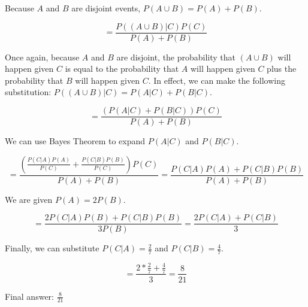 \documentclass{article}
\begin{document}
  Because $A$ and $B$ are disjoint events, $P(A \cup B) = P(A) + P(B)$. 
  
 \begin{equation}
     = \frac{P((A \cup B) | C)P(C)}{P(A) + P(B)}
 \end{equation}
 
 Once again, because $A$ and $B$ are disjoint, the probability that $(A \cup B)$ will happen given $C$ is equal to the probability that $A$ will happen given $C$ plus the probability that $B$ will happen given $C$. In effect, we can make the following substitution: $P((A \cup B) | C) = P(A|C) + P(B|C)$.
 
 \begin{equation}
     = \frac{(P(A|C)+P(B|C))P(C)}{P(A) + P(B)}
 \end{equation}
 
 We can use Bayes Theorem to expand $P(A|C)$ and $P(B|C)$. 
 
 \begin{equation}
     = \frac{(\frac{P(C|A)P(A)}{P(C)}+\frac{P(C|B)P(B)}{P(C)})P(C)}{P(A) + P(B)} = \frac{P(C|A)P(A)+P(C|B)P(B)}{P(A) + P(B)}
 \end{equation}
 
 We are given $P(A) = 2P(B)$.
 
 \begin{equation}
     = \frac{2P(C|A)P(B)+P(C|B)P(B)}{3P(B)} = \frac{2P(C|A)+P(C|B)}{3}
 \end{equation}
 
 Finally, we can substitute $P(C|A) = \frac{2}{7}$ and $P(C|B) = \frac{4}{7}$.
 
 \begin{equation}
     = \frac{2*\frac{2}{7}+\frac{4}{7}}{3} = \frac{8}{21}
 \end{equation}
 
 Final answer: $\frac{8}{21}$\newline
 
 
\end{document}
